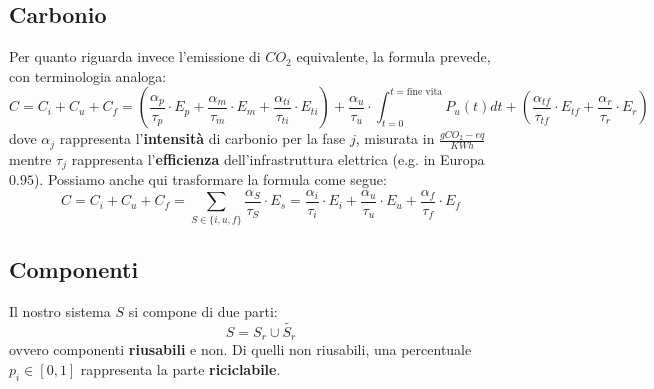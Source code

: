 \subsection{Carbonio}
Per quanto riguarda invece l'emissione di $CO_2$ equivalente, la formula prevede, con terminologia analoga:
\begin{equation}
	C = C_i + C_u + C_f = (\frac{\alpha_p}{\tau_p} \cdot E_p + \frac{\alpha_m}{\tau_m} \cdot E_m + \frac{\alpha_{ti}}{\tau_{ti}} \cdot E_{ti}) + \frac{\alpha_u}{\tau_u} \cdot \int_{t=0}^{t=\text{fine vita}}P_u(t)dt + (\frac{\alpha_{tf}}{\tau_{tf}} \cdot E_{tf} + \frac{\alpha_r}{\tau_r} \cdot E_r)
\end{equation}
dove $\alpha_j$ rappresenta l'\textbf{intensità} di carbonio per la fase $j$, misurata in $\frac{g CO_2-eq}{KWh}$ mentre $\tau_j$ rappresenta l'\textbf{efficienza} dell'infrastruttura elettrica (e.g. in Europa $0.95$). Possiamo anche qui trasformare la formula come segue:
\begin{equation}
	C = C_i  + C_u + C_f = \sum_{S \in \{i,u,f\}} \frac{\alpha_S}{\tau_S} \cdot E_s = \frac{\alpha_i}{\tau_i} \cdot E_i + \frac{\alpha_u}{\tau_u} \cdot E_u + \frac{\alpha_f}{\tau_f} \cdot E_f
\end{equation}

\subsection{Componenti}
Il nostro sistema $S$ si compone di due parti:
\begin{equation}
	S = S_r \cup  \tilde{S_r}
\end{equation}
ovvero componenti \textbf{riusabili} e non. Di quelli non riusabili, una percentuale $p_i \in [0,1]$  rappresenta la parte \textbf{riciclabile}.

